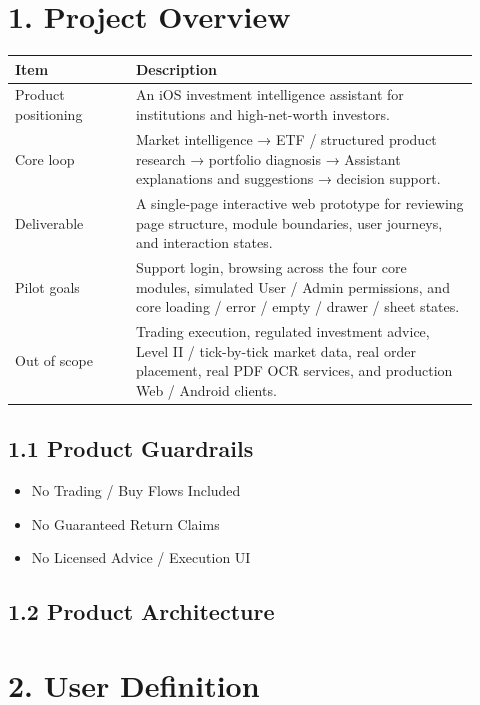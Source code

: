 
\section{1. Project Overview}

\begingroup
\small
\begin{longtable}{L{0.24\linewidth}L{0.68\linewidth}}
\toprule
\textbf{Item} & \textbf{Description} \\
\midrule
Product positioning & An iOS investment intelligence assistant for institutions and high-net-worth investors. \\
Core loop & Market intelligence → ETF / structured product research → portfolio diagnosis → Assistant explanations and suggestions → decision support. \\
Deliverable & A single-page interactive web prototype for reviewing page structure, module boundaries, user journeys, and interaction states. \\
Pilot goals & Support login, browsing across the four core modules, simulated User / Admin permissions, and core loading / error / empty / drawer / sheet states. \\
Out of scope & Trading execution, regulated investment advice, Level II / tick-by-tick market data, real order placement, real PDF OCR services, and production Web / Android clients. \\
\bottomrule
\end{longtable}
\endgroup

\subsection{1.1 Product Guardrails}

\begin{itemize}
\item No Trading / Buy Flows Included
\item No Guaranteed Return Claims
\item No Licensed Advice / Execution UI
\end{itemize}

\subsection{1.2 Product Architecture}


\section{2. User Definition}

